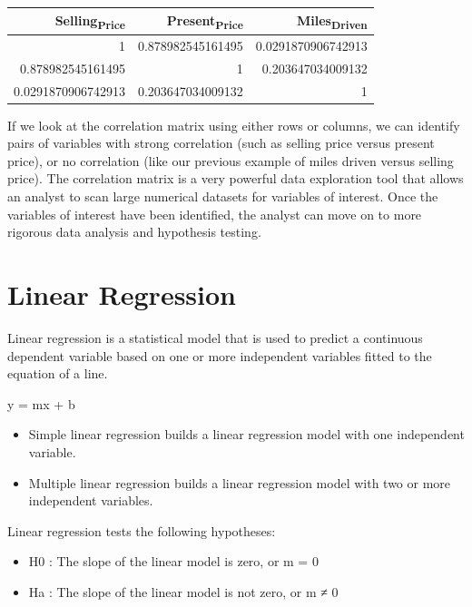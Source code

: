 \documentclass[11pt]{article}
\begin{document}
\begin{org}
\begin{center}
\begin{tabular}{rrr}
Selling\textsubscript{Price} & Present\textsubscript{Price} & Miles\textsubscript{Driven}\\
\hline
1 & 0.878982545161495 & 0.0291870906742913\\
0.878982545161495 & 1 & 0.203647034009132\\
0.0291870906742913 & 0.203647034009132 & 1\\
\end{tabular}
\end{center}
\end{org}

If we look at the correlation matrix using either rows or columns, we can identify pairs of variables with strong correlation (such as selling price versus present price), or no correlation (like our previous example of miles driven versus selling price).
The correlation matrix is a very powerful data exploration tool that allows an analyst to scan large numerical datasets for variables of interest. Once the variables of interest have been identified, the analyst can move on to more rigorous data analysis and hypothesis testing.

\section{Linear Regression}
\label{sec:orgaeeecf9}

Linear regression is a statistical model that is used to predict a continuous dependent variable based on one or more independent variables fitted to the equation of a line.

y = mx + b

\begin{itemize}
\item Simple linear regression builds a linear regression model with one independent variable.
\item Multiple linear regression builds a linear regression model with two or more independent variables.
\end{itemize}

Linear regression tests the following hypotheses:

\begin{itemize}
\item H0 : The slope of the linear model is zero, or m = 0
\item Ha : The slope of the linear model is not zero, or m ≠ 0
\end{itemize}
\end{document}
